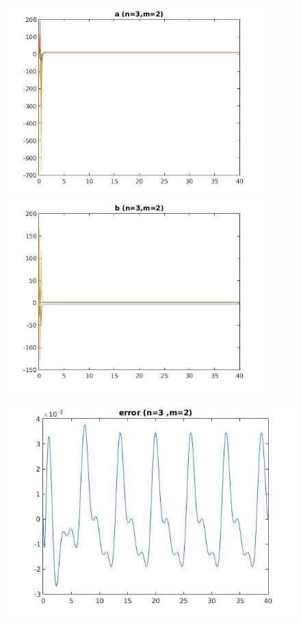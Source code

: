 \documentclass{article}
\begin{document}
\clearpage
\large
\begin{figure}[h!]
\centering 
 	  \begin{minipage}{0.48\textwidth}
     \centering
     \advance\leftskip-4cm
  \includegraphics[width=100mm,scale=2]{assets/try32o.jpg}
   \end{minipage} \hfill
    \begin{minipage}{0.48\textwidth}
  \includegraphics[width=100mm,scale=2]{assets/try32oo.jpg}
  \end{minipage}
\end{figure}
\begin{figure}[h!]
\centering
\advance\leftskip-0.5cm
 \includegraphics[width=140mm,scale=2]{assets/try32ooo.jpg}
\end{figure}
\end{document}

